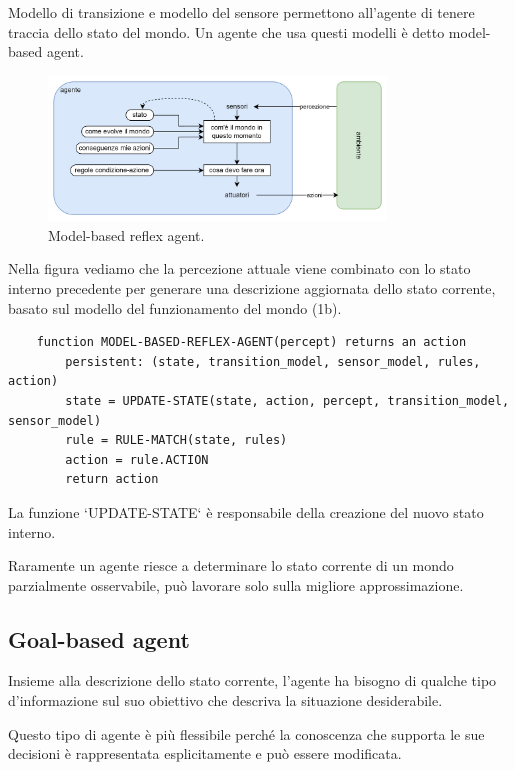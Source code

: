 Modello di transizione e modello del sensore permettono all'agente di tenere traccia dello stato del mondo. Un agente che usa questi modelli è detto model-based agent.

\begin{figure}[H]
	\centering
	\includegraphics[width=0.8\textwidth]{capitoli/agenti-intelligenti/imgs/model-based.png}
	\caption{Model-based reflex agent.}
\end{figure}

Nella figura vediamo che la percezione attuale viene combinato con lo stato interno precedente per generare una descrizione aggiornata dello stato corrente, basato sul modello del funzionamento del mondo (1b).

\begin{lstlisting}
	function MODEL-BASED-REFLEX-AGENT(percept) returns an action
		persistent: (state, transition_model, sensor_model, rules, action)
		state = UPDATE-STATE(state, action, percept, transition_model, sensor_model)
		rule = RULE-MATCH(state, rules)
		action = rule.ACTION
		return action
\end{lstlisting}

La funzione `UPDATE-STATE` è responsabile della creazione del nuovo stato interno.

Raramente un agente riesce a determinare lo stato corrente di un mondo parzialmente osservabile, può lavorare solo sulla migliore approssimazione.

\subsection{Goal-based agent}

Insieme alla descrizione dello stato corrente, l'agente ha bisogno di qualche tipo d'informazione sul suo obiettivo che descriva la situazione desiderabile.

Questo tipo di agente è più flessibile perché la conoscenza che supporta le sue decisioni è rappresentata esplicitamente e può essere modificata.

